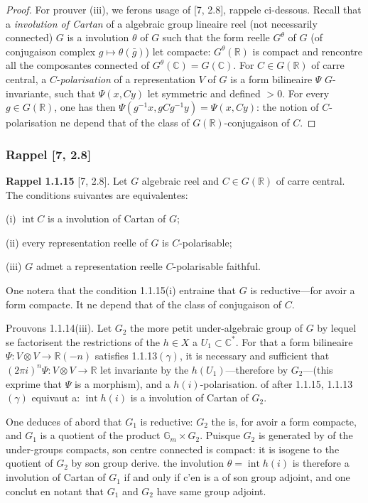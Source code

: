 \documentclass[12pt,a4paper]{article}
\theoremstyle{plain}
\theoremstyle{definition}
\theoremstyle{remark}
\DeclareMathOperator{\Int}{int}
\newcommand{\RR}{\mathbb{R}}
\newcommand{\CC}{\mathbb{C}}
\newcommand{\Gm}{\mathbb{G}}
\begin{document}
\begin{proof}
For prouver (iii), we ferons usage of [7, 2.8], rappele ci-dessous. Recall that a \textit{involution of Cartan} of a algebraic group lineaire reel (not necessarily connected) $G$ is a involution $\theta$ of $G$ such that the form reelle $G^{\theta}$ of $G$ (of conjugaison complex $g \mapsto \theta(\bar{g})$) let compacte: $G^{\theta}(\RR)$ is compact and rencontre all the composantes connected of $G^{\theta}(\CC) = G(\CC)$. For $C \in G(\RR)$ of carre central, a $C$-\textit{polarisation} of a representation $V$ of $G$ is a form bilineaire $\Psi$ $G$-invariante, such that $\Psi(x,Cy)$ let symmetric and defined $>0$. For every $g \in G(\RR)$, one has then $\Psi(g^{-1}x, gCg^{-1}y) = \Psi(x,Cy)$: the notion of $C$-polarisation ne depend that of the class of $G(\RR)$-conjugaison of $C$.
\end{proof}

\subsubsection{Rappel [7, 2.8]}

\textbf{Rappel 1.1.15} [7, 2.8]. Let $G$ algebraic reel and $C \in G(\RR)$ of carre central. The conditions suivantes are equivalentes:

(i) $\Int C$ is a involution of Cartan of $G$;

(ii) every representation reelle of $G$ is $C$-polarisable;

(iii) $G$ admet a representation reelle $C$-polarisable faithful.

One notera that the condition 1.1.15(i) entraine that $G$ is reductive---for avoir a form compacte. It ne depend that of the class of conjugaison of $C$.

Prouvons 1.1.14(iii). Let $G_2$ the more petit under-algebraic group of $G$ by lequel se factorisent the restrictions of the $h \in X$ a $U_1 \subset \CC^*$. For that a form bilineaire $\Psi:V \otimes V \to \RR(-n)$ satisfies 1.1.13$(\gamma)$, it is necessary and sufficient that $(2\pi i)^n\Psi:V \otimes V \to \RR$ let invariante by the $h(U_1)$---therefore by $G_2$---(this exprime that $\Psi$ is a morphism), and a $h(i)$-polarisation. of after 1.1.15, 1.1.13$(\gamma)$ equivaut a: $\Int h(i)$ is a involution of Cartan of $G_2$.

One deduces of abord that $G_1$ is reductive: $G_2$ the is, for avoir a form compacte, and $G_1$ is a quotient of the product $\Gm_m \times G_2$. Puisque $G_2$ is generated by of the under-groups compacts, son centre connected is compact: it is isogene to the quotient of $G_2$ by son group derive. the involution $\theta = \Int h(i)$ is therefore a involution of Cartan of $G_1$ if and only if c'en is a of son group adjoint, and one conclut en notant that $G_1$ and $G_2$ have same group adjoint.
\end{document}
